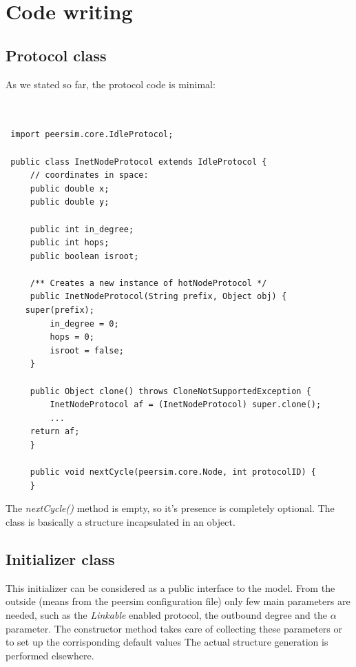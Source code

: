 \documentclass[a4paper,12pt]{article}
\begin{document}
\section{Code writing}

\subsection{Protocol class}

 As we stated so far, the protocol code is minimal:

\footnotesize
\begin{verbatim}
 
 
 import peersim.core.IdleProtocol;
 
 public class InetNodeProtocol extends IdleProtocol {
     // coordinates in space:
     public double x;
     public double y;
     
     public int in_degree;
     public int hops;
     public boolean isroot;
    
     /** Creates a new instance of hotNodeProtocol */
     public InetNodeProtocol(String prefix, Object obj) {
    super(prefix);
         in_degree = 0;
         hops = 0;
         isroot = false;
     }
     
     public Object clone() throws CloneNotSupportedException {
         InetNodeProtocol af = (InetNodeProtocol) super.clone();
         ...
	 return af;
     }
    
     public void nextCycle(peersim.core.Node, int protocolID) {
     }

\end{verbatim}
\normalsize

The \emph{nextCycle()} method is empty, so it's presence is completely 
optional. The class is basically a structure incapsulated in an object.
 
 

\subsection{Initializer class}

 This initializer can be considered as a public interface to the model. 
From the outside (means from the peersim configuration file) only few 
main parameters are needed, such as the \emph{Linkable} enabled protocol, 
the outbound degree and the $\alpha$ parameter. The constructor method 
takes care of collecting these parameters or to set up the corrisponding 
default values The actual structure generation is performed elsewhere.
\end{document}
